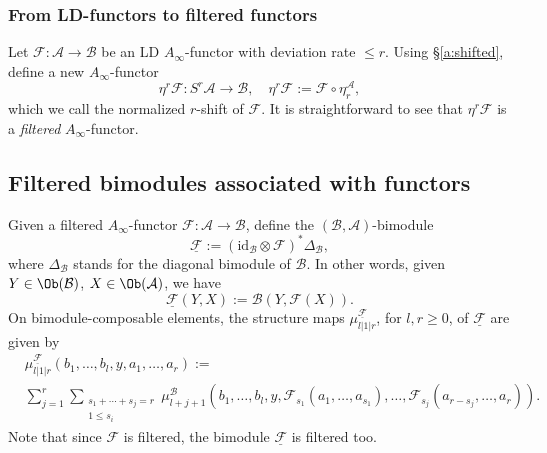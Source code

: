 \subsubsection{From LD-functors to filtered functors} \label{a:ld-fil}

Let $\mathcal{F} : \mathcal{A} \longrightarrow \mathcal{B}$ be an LD
$A_{\infty}$-functor with deviation rate $\leq r$. Using \S\ref{a:shifted}, define a new
$A_{\infty}$-functor
$$\eta^r \mathcal{F}: S^r \mathcal{A} \longrightarrow \mathcal{B},
\quad \eta^r \mathcal{F} :=\mathcal{F} \circ \eta^{\mathcal{A}}_r,$$
which we call the normalized $r$-shift of $\mathcal{F}$. It is
straightforward to see that $\eta^r \mathcal{F}$ is a {\em filtered}
$A_{\infty}$-functor.



\subsection{Filtered bimodules associated with
  functors} \label{a:func-fil-bimod} Given a filtered
$A_{\infty}$-functor
$\mathcal{F}: \mathcal{A} \longrightarrow \mathcal{B}$, define the
$(\mathcal{B},\mathcal{A})$-bimodule
$$\underline{\mathcal{F}}:=
(\text{id}_\mathcal{B} \otimes \mathcal{F})^*\Delta_{\mathcal{B}},$$
where $\Delta_{\mathcal{B}}$ stands for the diagonal bimodule of
$\mathcal{B}$. In other words, given $Y \in \Ob(\mathcal{B})$,
$X \in \Ob(\mathcal{A})$, we have
$$\underline{\mathcal{F}}(Y,X):= \mathcal{B}(Y,\mathcal{F}(X)).$$
On bimodule-composable elements, the structure maps
$\mu^{\underline{\mathcal{F}}}_{l|1|r}$, for $l,r\geq 0$, of
$\underline{\mathcal{F}}$ are given by
\begin{equation*}
  \begin{aligned}
    & \mu^{\underline{\mathcal{F}}}_{l|1|r}(b_1,\ldots, b_l,y,a_1,\ldots, a_r)
    := \\
  & \sum_{j=1}^r \sum_{\substack{s_1 + \cdots + s_j = r \\ 1 \leq s_i}}
\mu^{\mathcal{B}}_{l+j+1}(b_1,\ldots, b_l, y,
\mathcal{F}_{s_1}(a_1,\ldots, a_{s_1}),\ldots,
    \mathcal{F}_{s_j}(a_{r-s_j},\ldots, a_r)).
  \end{aligned}
\end{equation*}
Note that since $\mathcal{F}$ is filtered, the bimodule
$\underline{\mathcal{F}}$ is filtered too.

